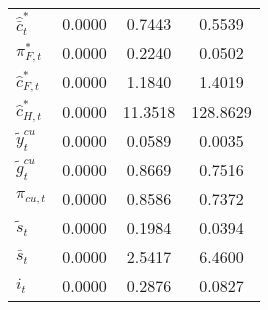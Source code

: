 \begin{center}
\begin{longtable}{lccc}
${\hat {\bar c}_t^*}  $	 & 	       0.0000	 & 	       0.7443	 & 	       0.5539 \\ 
${\pi_{F,t}^*}        $	 & 	       0.0000	 & 	       0.2240	 & 	       0.0502 \\ 
${\hat c_{F,t}^*}     $	 & 	       0.0000	 & 	       1.1840	 & 	       1.4019 \\ 
${\hat c_{H,t}^*}     $	 & 	       0.0000	 & 	      11.3518	 & 	     128.8629 \\ 
${\tilde y_t^{cu}}    $	 & 	       0.0000	 & 	       0.0589	 & 	       0.0035 \\ 
${\tilde g_t^{cu}}    $	 & 	       0.0000	 & 	       0.8669	 & 	       0.7516 \\ 
${\pi_{cu,t}}         $	 & 	       0.0000	 & 	       0.8586	 & 	       0.7372 \\ 
${\tilde s_t}         $	 & 	       0.0000	 & 	       0.1984	 & 	       0.0394 \\ 
${\bar s_t}           $	 & 	       0.0000	 & 	       2.5417	 & 	       6.4600 \\ 
${i_t}                $	 & 	       0.0000	 & 	       0.2876	 & 	       0.0827 \\ 
\end{longtable}
 \end{center}
